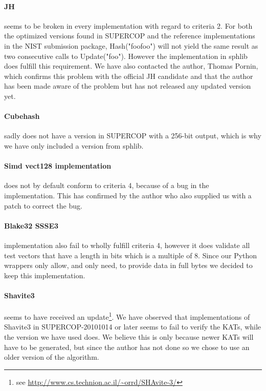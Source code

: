 \documentclass[english,12pt,a4paper]{book}
\begin{document}




\paragraph{JH} seems to be broken in every implementation with regard to
criteria 2. For both the optimized versions found in \ac{SUPERCOP} and the
reference implementations in the \ac{NIST} submission package, Hash("foofoo")
will not yield the same result as two consecutive calls to Update("foo").
However the implementation in sphlib does fulfill this requirement. We have
also contacted the author, Thomas Pornin, which confirms this problem with the
official JH candidate and that the author has been made aware of the problem
but has not released any updated version yet.

\paragraph{Cubehash} sadly does not have a version in \ac{SUPERCOP} with a 256-bit
output, which is why we have only included a version from sphlib.

\paragraph{Simd vect128 implementation} does not by default conform to
criteria 4, because of a bug in the implementation. This has confirmed by the
author who also supplied us with a patch to correct the bug.

\paragraph{Blake32 \ac{SSSE3}} implementation also fail to wholly fulfill
criteria 4, however it does validate all test vectors that have a length 
in bits which is a multiple of 8. Since our Python wrappers only allow, and
only need, to provide data in full bytes we decided to keep this
implementation.

\paragraph{Shavite3} seems to have received an update\footnote{see
\url{http://www.cs.technion.ac.il/~orrd/SHAvite-3/}}. We have observed that
implementations of Shavite3 in \ac{SUPERCOP}-20101014 or later seems to fail to
verify the \ac{KAT}s, while the version we have used does. We believe this is
only because newer \ac{KAT}s will have to be generated, but since the author
has not done so we chose to use an older version of the algorithm.
\end{document}
